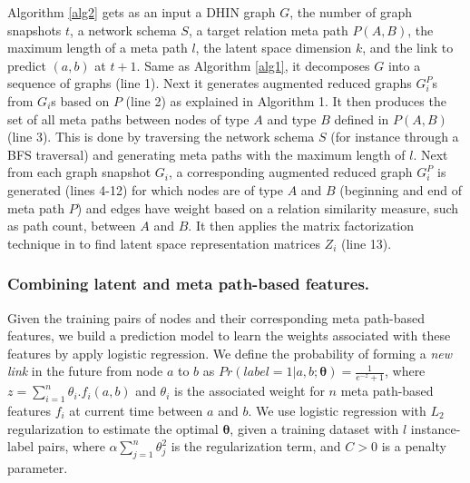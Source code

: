 Algorithm \ref{alg2} gets as an input a DHIN graph $G$, the number of graph snapshots $t$, a network schema $S$, a target relation meta path $P(A,B)$, the maximum length of a meta path $l$, the latent space dimension $k$, and the link to predict $(a,b)$ at $t+1$. Same as Algorithm \ref{alg1}, it decomposes $G$ into a sequence of graphs (line 1). Next it generates augmented reduced graphs $G^P_i$s from $G_i$s based on $P$ (line 2) as explained in Algorithm 1. It then produces the set of all meta paths between nodes of type $A$ and type $B$ defined in $P(A,B)$ (line 3). This is done by traversing the network schema $S$ (for instance through a BFS traversal) and generating meta paths with the maximum length of $l$. Next from each graph snapshot $G_i$, a corresponding augmented reduced graph $G^P_i$ is generated (lines 4-12) for which nodes are of type $A$ and $B$ (beginning and end of meta path $P$) and edges have weight based on a relation similarity measure, such as path count, between $A$ and $B$. It then applies the matrix factorization technique in \cite{Zhu2016} to find latent space representation matrices $Z_i$ (line 13).






\subsubsection{Combining latent and meta path-based features.}
 Given the training pairs of nodes and their corresponding meta path-based features, we build a prediction model to learn the weights associated with these features by apply logistic regression. We define the probability of forming a \textit{new link} in the future from node $a$ to $b$ as $Pr(label=1|a, b; \boldsymbol{\theta}) = \frac{1}{e^{-z}+1}$, where $z=\sum\limits_{i=1}^{n}\theta_i.f_i(a,b)$ and $\theta_i$ is the associated weight for $n$ meta path-based features $f_i$ at current time between $a$ and $b$. We use logistic regression with $L_2$ regularization to estimate the optimal $\boldsymbol{\theta}$, given a training dataset with $l$ instance-label pairs, where $\alpha \sum_{j=1}^n \theta_j^2$ is the regularization term, and $C>0$ is a penalty parameter. 

